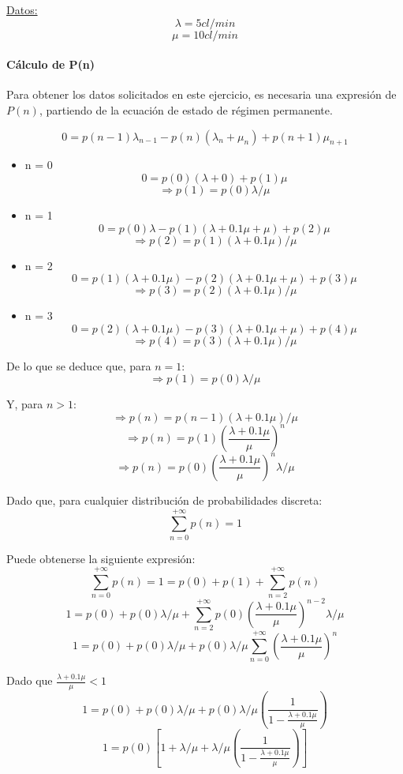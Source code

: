 \documentclass{article}
\begin{document}
   \underline{Datos:} \\
   $$\lambda = 5 cl/min $$
   $$\mu = 10 cl/min $$

   \paragraph{Cálculo de P(n)}
   Para obtener los datos solicitados en este ejercicio, es necesaria una expresión de $P(n)$, partiendo de la ecuación de estado de régimen permanente.

      $$0 = p(n-1) \lambda_{n-1} - p(n) (\lambda_n + \mu_n) + p(n+1) \mu_{n+1}$$

      \begin{itemize}
         \item{n = 0}
            $$0 = p(0) (\lambda + 0) + p(1) \mu$$
            $$\Rightarrow p(1) = p(0) \lambda / \mu$$
         \item{n = 1}
            $$0 = p(0) \lambda - p(1) (\lambda + 0.1 \mu + \mu) + p(2) \mu$$
            $$\Rightarrow p(2) = p(1) (\lambda + 0.1 \mu) / \mu$$
         \item{n = 2}
            $$0 = p(1) (\lambda + 0.1 \mu) - p(2) (\lambda + 0.1 \mu + \mu) + p(3) \mu$$
            $$\Rightarrow p(3) = p(2) (\lambda + 0.1 \mu) / \mu$$
         \item{n = 3}
            $$0 = p(2) (\lambda + 0.1 \mu) - p(3) (\lambda + 0.1 \mu + \mu) + p(4) \mu$$
            $$\Rightarrow p(4) = p(3) (\lambda + 0.1 \mu) / \mu$$
      \end{itemize}

   De lo que se deduce que, para $n = 1$:
      $$\Rightarrow p(1) = p(0) \lambda / \mu$$

   Y, para $n > 1$:
      $$\Rightarrow p(n) = p(n - 1) (\lambda + 0.1 \mu ) / \mu$$
      $$\Rightarrow p(n) = p(1) (\frac{\lambda + 0.1 \mu}{\mu})^n$$
      $$\Rightarrow p(n) = p(0) (\frac{\lambda + 0.1 \mu}{\mu})^n \lambda / \mu$$

   Dado que, para cualquier distribución de probabilidades discreta:
      $$\sum_{n=0}^{+\infty} p(n) = 1$$

   Puede obtenerse la siguiente expresión:
      $$\sum_{n=0}^{+\infty} p(n) = 1 = p(0) + p(1) + \sum_{n=2}^{+\infty} p(n)$$
      $$1 = p(0) + p(0) \lambda / \mu + \sum_{n=2}^{+\infty} p(0) (\frac{\lambda + 0.1 \mu}{\mu})^{n-2} \lambda / \mu$$
      $$1 = p(0) + p(0) \lambda / \mu + p(0) \lambda / \mu \sum_{n=0}^{+\infty} (\frac{\lambda + 0.1 \mu}{\mu})^n$$

   Dado que $\frac{\lambda + 0.1 \mu}{\mu} < 1$
      $$1 = p(0) + p(0) \lambda / \mu + p(0) \lambda / \mu (\frac{1}{1 - \frac{\lambda + 0.1\mu}{\mu}})$$
      $$1 = p(0) [1 + \lambda / \mu + \lambda / \mu (\frac{1}{1 - \frac{\lambda + 0.1\mu}{\mu}})]$$
\end{document}
